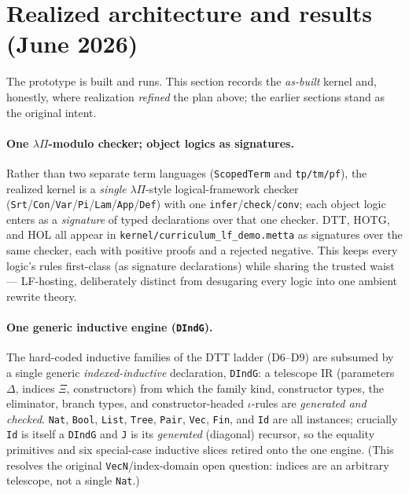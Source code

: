 \documentclass[11pt]{article}
\newcommand{\HOTG}{HOTG}
\newcommand{\DTT}{DTT}
\newcommand{\code}[1]{\texttt{#1}}
\begin{document}
\section{Realized architecture and results (June 2026)}
\label{sec:realized}

The prototype is built and runs. This section records the \emph{as-built} kernel and,
honestly, where realization \emph{refined} the plan above; the earlier sections stand
as the original intent.

\paragraph{One $\lambda\Pi$-modulo checker; object logics as signatures.} Rather than
two separate term languages (\code{ScopedTerm} and \code{tp/tm/pf}), the realized kernel is
a \emph{single} $\lambda\Pi$-style logical-framework checker
(\code{Srt}/\code{Con}/\code{Var}/\code{Pi}/\code{Lam}/\code{App}/\code{Def}) with one
\code{infer}/\code{check}/\code{conv}; each object logic enters as a \emph{signature} of
typed declarations over that one checker. \DTT{}, \HOTG{}, and HOL all appear in
\code{kernel/curriculum\_lf\_demo.metta} as signatures over the same checker, each with
positive proofs and a rejected negative. This keeps every logic's rules first-class (as
signature declarations) while sharing the trusted waist --- LF-hosting, deliberately
distinct from desugaring every logic into one ambient rewrite theory.

\paragraph{One generic inductive engine (\code{DIndG}).} The hard-coded inductive
families of the \DTT{} ladder (D6--D9) are subsumed by a single generic
\emph{indexed-inductive} declaration, \code{DIndG}: a telescope IR (parameters $\Delta$,
indices $\Xi$, constructors) from which the family kind, constructor types, the
eliminator, branch types, and constructor-headed $\iota$-rules are \emph{generated and
checked}. \code{Nat}, \code{Bool}, \code{List}, \code{Tree}, \code{Pair}, \code{Vec},
\code{Fin}, and \code{Id} are all instances; crucially \code{Id} is itself a
\code{DIndG} and \code{J} is its \emph{generated} (diagonal) recursor, so the equality
primitives and six special-case inductive slices retired onto the one engine. (This
resolves the original \code{VecN}/index-domain open question: indices are an arbitrary
telescope, not a single \code{Nat}.)
\end{document}
